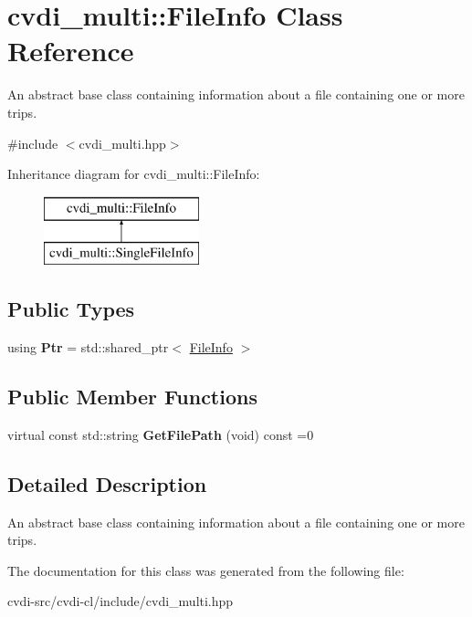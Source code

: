 \hypertarget{classcvdi__multi_1_1FileInfo}{}\section{cvdi\+\_\+multi\+:\+:File\+Info Class Reference}
\label{classcvdi__multi_1_1FileInfo}


An abstract base class containing information about a file containing one or more trips.  




{\ttfamily \#include $<$cvdi\+\_\+multi.\+hpp$>$}

Inheritance diagram for cvdi\+\_\+multi\+:\+:File\+Info\+:\begin{figure}[H]
\begin{center}
\leavevmode
\includegraphics[height=2.000000cm]{classcvdi__multi_1_1FileInfo}
\end{center}
\end{figure}
\subsection*{Public Types}
\begin{DoxyCompactItemize}
\item 
using {\bfseries Ptr} = std\+::shared\+\_\+ptr$<$ \hyperlink{classcvdi__multi_1_1FileInfo}{File\+Info} $>$\hypertarget{classcvdi__multi_1_1FileInfo_aea599c96f681f77df5c4de62d8e7d744}{}\label{classcvdi__multi_1_1FileInfo_aea599c96f681f77df5c4de62d8e7d744}

\end{DoxyCompactItemize}
\subsection*{Public Member Functions}
\begin{DoxyCompactItemize}
\item 
virtual const std\+::string {\bfseries Get\+File\+Path} (void) const =0\hypertarget{classcvdi__multi_1_1FileInfo_ac4b8f30218d9b9d5dcb0bbfee14ad026}{}\label{classcvdi__multi_1_1FileInfo_ac4b8f30218d9b9d5dcb0bbfee14ad026}

\end{DoxyCompactItemize}


\subsection{Detailed Description}
An abstract base class containing information about a file containing one or more trips. 

The documentation for this class was generated from the following file\+:\begin{DoxyCompactItemize}
\item 
cvdi-\/src/cvdi-\/cl/include/cvdi\+\_\+multi.\+hpp\end{DoxyCompactItemize}
